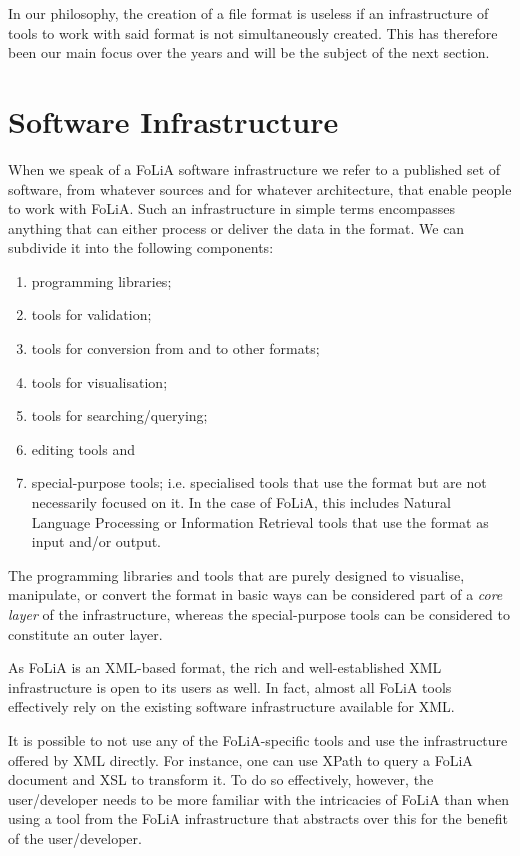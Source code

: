 \documentclass[a4paper,11pt]{article}
\begin{document}
In our philosophy, the creation of a file format is useless if
an infrastructure of tools to work with said format is not simultaneously created.
This has therefore been our main focus over the years and will be the subject
of the next section.

\section{Software Infrastructure}
\label{sec:softwareinfrastructure}

When we speak of a FoLiA software infrastructure we refer to a published set of
software, from whatever sources and for whatever architecture, that enable
people to work with FoLiA. Such an infrastructure in simple terms encompasses
anything that can either process or deliver the data in the format. We can
subdivide it into the following components:

\begin{enumerate}
\item programming libraries;
\item tools for validation;
\item tools for conversion from and to other formats;
\item tools for visualisation;
\item tools for searching/querying;
\item editing tools and
\item special-purpose tools; i.e. specialised tools that use the format but are
    not necessarily focused on it. In the case of FoLiA, this includes Natural
    Language Processing or Information Retrieval tools that use the format as
    input and/or output.
\end{enumerate}

The programming libraries and tools that are purely designed to visualise,
manipulate, or convert the format in basic ways can be considered part of a
\emph{core layer} of the infrastructure, whereas the special-purpose tools can
be considered to constitute an outer layer.

As FoLiA is an XML-based format, the rich and well-established XML
infrastructure is open to its users as well. In fact, almost all FoLiA tools
effectively rely on the existing software infrastructure available for XML.

It is possible to not use any of the FoLiA-specific tools and use the
infrastructure offered by XML directly. For instance, one can use XPath to
query a FoLiA document and XSL to transform it. To do so effectively, however,
the user/developer needs to be more familiar with the intricacies of FoLiA than when using a tool from the FoLiA infrastructure that abstracts over this
for the benefit of the user/developer.
\end{document}
